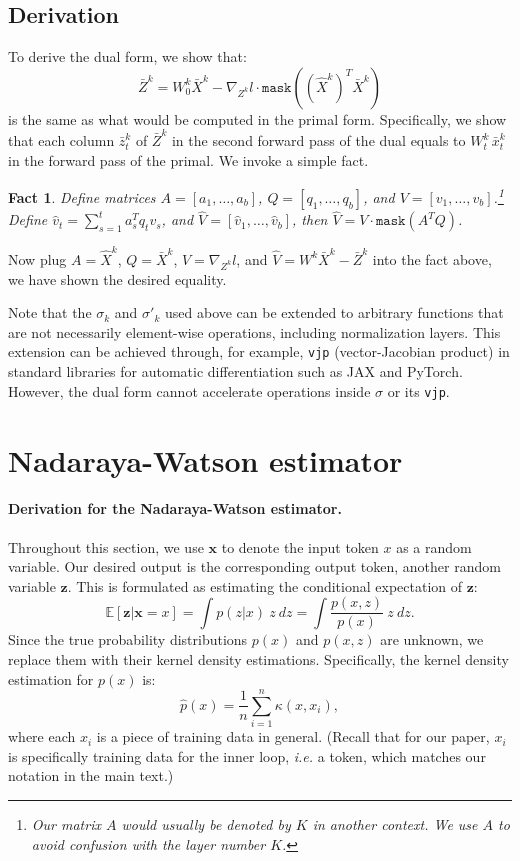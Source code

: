 \documentclass{article}
\newtheorem{fact}{Fact}
\newcommand{\E}{\mathbb{E}}
\begin{document}
\subsection{Derivation}
To derive the dual form, we show that:
$$\bar{Z}^k = W_0^k\bar{X}^k - \nabla_{Z^k}l\cdot \texttt{mask}\left( \left(\hat{X}^k\right)^T\bar{X}^k \right)$$
is the same as what would be computed in the primal form.
Specifically, we show that each column $\bar{z}_t^k$ of $\bar{Z}^k$ in the second forward pass of the dual equals to $W_t^k \, \bar{x}_t^k$ in the forward pass of the primal.
We invoke a simple fact.
\begin{fact}
Define matrices $A = [a_1,\dots,a_b]$, $Q = [q_1,\dots,q_b]$, and $V = [v_1,\dots,v_b]$.\footnote{
Our matrix $A$ would usually be denoted by $K$ in another context.
We use $A$ to avoid confusion with the layer number $K$.
}
Define $\hat{v}_t = \sum_{s=1}^t a_s^Tq_t v_s$, and $\hat{V} = [\hat{v}_1,\dots,\hat{v}_b]$, then $\hat{V} = V \cdot \texttt{mask}(A^TQ)$.
\end{fact}

Now plug $A = \hat{X}^k$, $Q = \bar{X}^k$, $V = \nabla_{Z^k}l$, and $\hat{V} = W^k\bar{X}^k - \bar{Z}^k$ into the fact above, we have shown the desired equality.

Note that the $\sigma_k$ and $\sigma'_k$ used above can be extended to arbitrary functions that are not necessarily element-wise operations, including normalization layers.
This extension can be achieved through, for example, \texttt{vjp} (vector-Jacobian product) in standard libraries for automatic differentiation such as JAX and PyTorch. 
However, the dual form cannot accelerate operations inside $\sigma$ or its \texttt{vjp}.
\clearpage

\section{Nadaraya-Watson estimator}
\label{app:theory}

\paragraph{Derivation for the Nadaraya-Watson estimator.}
Throughout this section, we use $\mathbf{x}$ to denote the input token $x$ as a random variable.
Our desired output is the corresponding output token, another random variable $\mathbf{z}$.
This is formulated as estimating the conditional expectation of $\mathbf{z}$:
$$
\E[\mathbf{z}|\mathbf{x} = x] = \int p(z|x)~z~dz = \int \frac{p(x, z)}{p(x)}~z~dz.
$$
Since the true probability distributions $p(x)$ and $p(x, z)$ are unknown, we replace them with their kernel density estimations.
Specifically, the kernel density estimation for $p(x)$ is:
$$
\hat{p}(x) = \frac{1}{n}\sum_{i=1}^n \kappa(x, x_i),
$$
where each $x_i$ is a piece of training data in general.
(Recall that for our paper, $x_i$ is specifically training data for the inner loop, \textit{i.e.} a token, which matches our notation in the main text.)
\end{document}
